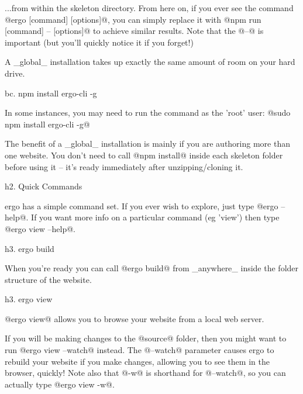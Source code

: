 ...from within the skeleton directory. From here on, if you ever see the command @ergo [command] [options]@, you can simply replace it with @npm run [command] -- [options]@ to achieve similar results. Note that the @--@ is important (but you'll quickly notice it if you forget!)

A _global_ installation takes up exactly the same amount of room on your hard drive. 

bc. npm install ergo-cli -g

In some instances, you may need to run the command as the 'root' user: @sudo npm install ergo-cli -g@

The benefit of a _global_ installation is mainly if you are authoring more than one website. You don't need to call @npm install@ inside each skeleton folder before using it -- it's ready immediately after unzipping/cloning it.


h2. Quick Commands

ergo has a simple command set. If you ever wish to explore, just type @ergo --help@. If you want more info on a particular command (eg 'view') then type @ergo view --help@.

h3. ergo build

When you're ready you can call @ergo build@ from _anywhere_ inside the folder structure of the website. 


h3. ergo view

@ergo view@ allows you to browse your website from a local web server.

If you will be making changes to the @source@ folder, then you might want to run @ergo view --watch@ instead. The @--watch@ parameter causes ergo to rebuild your website if you make changes, allowing you to see them in the browser, quickly! Note also that @-w@ is shorthand for @--watch@, so you can actually type @ergo view -w@.

